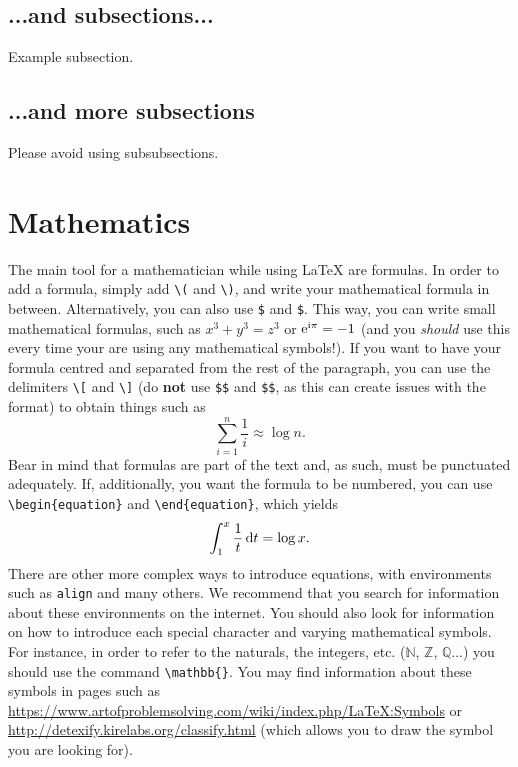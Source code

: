 \documentclass[babel-main=english]{TEMat-article}
\begin{document}
\subsection{...and subsections...}

Example subsection.

\subsection{...and more subsections}

Please avoid using subsubsections.

\section{Mathematics}

The main tool for a mathematician while using \LaTeX{} are formulas.
In order to add a formula, simply add \verb+\(+ and \verb+\)+, and write your mathematical formula in between.
Alternatively, you can also use \verb+$+ and \verb+$+.
This way, you can write small mathematical formulas, such as \(x^3+y^3=z^3\) or $\mathrm{e}^{\mathrm{i}\pi}=-1$ (and you \emph{should} use this every time your are using any mathematical symbols!).
If you want to have your formula centred and separated from the rest of the paragraph, you can use the delimiters \verb+\[+ and \verb+\]+ (do \textbf{not} use \verb+$$+ and \verb+$$+, as this can create issues with the format) to obtain things such as
\[\sum_{i=1}^n\frac{1}{i}\approx\log n.\]
Bear in mind that formulas are part of the text and, as such, must be punctuated adequately.
If, additionally, you want the formula to be numbered, you can use \verb+\begin{equation}+ and \verb+\end{equation}+, which yields
\begin{equation}\label{equa:example1}
\int_{1}^x\frac{1}{t} \mathop{}\!\mathrm{d} t = \log x.
\end{equation}
There are other more complex ways to introduce equations, with environments such as \verb+align+ and many others.
We recommend that you search for information about these environments on the internet.
You should also look for information on how to introduce each special character and varying mathematical symbols.
For instance, in order to refer to the naturals, the integers, etc. ($\mathbb{N}$, $\mathbb{Z}$, $\mathbb{Q}$...) you should use the command \verb+\mathbb{}+.
You may find information about these symbols in pages such as \url{https://www.artofproblemsolving.com/wiki/index.php/LaTeX:Symbols} or \url{http://detexify.kirelabs.org/classify.html} (which allows you to draw the symbol you are looking for).
\end{document}

